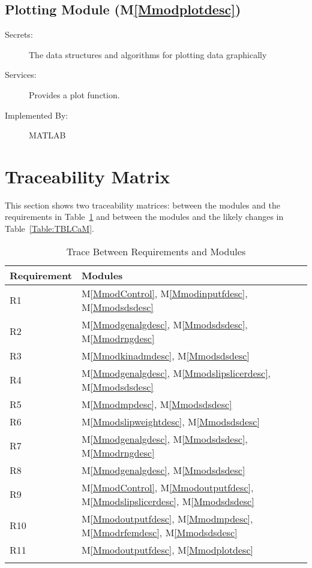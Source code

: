 \documentclass[12pt]{article}
\begin{document}
\subsection{Plotting Module (M\ref{Mmodplotdesc})}
\label{Sec:PM()}
\begin{description}
\item[Secrets:]The data structures and algorithms for plotting data graphically
\item[Services:]Provides a plot function.
\item[Implemented By:]MATLAB
\end{description}
\section{Traceability Matrix}
\label{Sec:TM}
This section shows two traceability matrices: between the modules and the requirements in Table~\ref{Table:TBRaM} and between the modules and the likely changes in Table~\ref{Table:TBLCaM}.
\begin{longtable}{l l}
\toprule
Requirement & Modules
\\
\midrule
R1 & M\ref{MmodControl}, M\ref{Mmodinputfdesc}, M\ref{Mmodsdsdesc}
\\
R2 & M\ref{Mmodgenalgdesc}, M\ref{Mmodsdsdesc}, M\ref{Mmodrngdesc}
\\
R3 & M\ref{Mmodkinadmdesc}, M\ref{Mmodsdsdesc}
\\
R4 & M\ref{Mmodgenalgdesc}, M\ref{Mmodslipslicerdesc}, M\ref{Mmodsdsdesc}
\\
R5 & M\ref{Mmodmpdesc}, M\ref{Mmodsdsdesc}
\\
R6 & M\ref{Mmodslipweightdesc}, M\ref{Mmodsdsdesc}
\\
R7 & M\ref{Mmodgenalgdesc}, M\ref{Mmodsdsdesc}, M\ref{Mmodrngdesc}
\\
R8 & M\ref{Mmodgenalgdesc}, M\ref{Mmodsdsdesc}
\\
R9 & M\ref{MmodControl}, M\ref{Mmodoutputfdesc}, M\ref{Mmodslipslicerdesc}, M\ref{Mmodsdsdesc}
\\
R10 & M\ref{Mmodoutputfdesc}, M\ref{Mmodmpdesc}, M\ref{Mmodrfemdesc}, M\ref{Mmodsdsdesc}
\\
R11 & M\ref{Mmodoutputfdesc}, M\ref{Mmodplotdesc}
\\
\bottomrule
\caption{Trace Between Requirements and Modules}
\label{Table:TBRaM}
\end{longtable}
\end{document}
